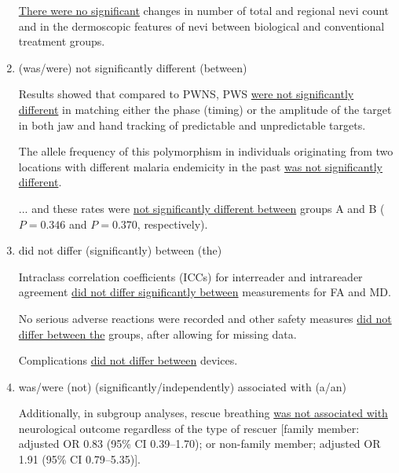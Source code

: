 \documentclass{ctexbook}
\begin{document}
\begin{enumerate}
      \begin{eg}{}
        \uline{There were no significant} changes in number of total and regional nevi count and in the dermoscopic features of nevi between biological and conventional treatment groups.
      \end{eg}

      \item (was/were) not significantly different (between)
      \begin{eg}{}
        Results showed that compared to PWNS, PWS \uline{were not significantly different} in matching either the phase (timing) or the amplitude of the target in both jaw and hand tracking of predictable and unpredictable targets.
      \end{eg}

      \begin{eg}{}
        The allele frequency of this polymorphism in individuals originating from two locations with different malaria endemicity in the past \uline{was not significantly different}.  
      \end{eg}

      \begin{eg}{}
        ... and these rates were \uline{not significantly different between} groups A and B ($P=0. 346$ and $P=0. 370$, respectively).          
      \end{eg}

      \item did not differ (significantly) between (the)
      \begin{eg}{}
        Intraclass correlation coefficients (ICCs) for interreader and intrareader agreement \uline{did not differ significantly between} measurements for FA and MD. 
      \end{eg}

      \begin{eg}{}
        No serious adverse reactions were recorded and other safety measures \uline{did not differ between the} groups, after allowing for missing data. 
      \end{eg}

      \begin{eg}{}
        Complications \uline{did not differ between} devices.
      \end{eg}

      \item was/were (not) (significantly/independently) associated with (a/an)
      \begin{eg}{}
        Additionally, in subgroup analyses, rescue breathing \uline{was not associated with} neurological outcome regardless of the type of rescuer [family member: adjusted OR $0. 83$ (95\% CI 0.39--1.70); or non-family member; adjusted OR 1.91 (95\% CI 0.79--5.35)].  
      \end{eg}


\end{enumerate}
\end{document}
